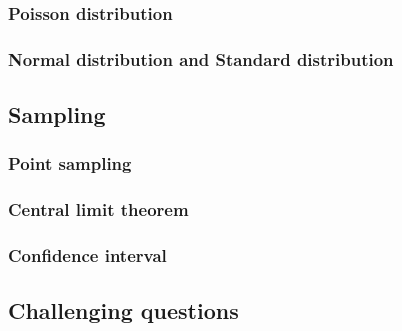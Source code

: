 \documentclass[12pt]{article}
\begin{document}
    \subsubsection*{Poisson distribution}

    \subsubsection*{Normal distribution and Standard distribution}

    \subsection{Sampling}

    \subsubsection*{Point sampling}

    \subsubsection*{Central limit theorem}

    \subsubsection*{Confidence interval}

    \subsection{Challenging questions}
\end{document}
